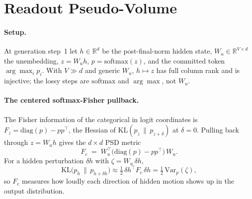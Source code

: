 \documentclass[10pt, letterpaper]{article}
\newcommand{\Fc}{F_{c}}
\newcommand{\Wu}{W_{u}}
\begin{document}
\section{Readout Pseudo-Volume}
\label{sec:method}

\paragraph{Setup.}
At generation step~1 let $h\in\mathbb{R}^d$ be the post-final-norm
hidden state, $\Wu\in\mathbb{R}^{V\times d}$ the unembedding,
$z=\Wu h$, $p=\mathrm{softmax}(z)$, and the committed token
$\arg\max_i p_i$. With $V\gg d$ and generic $\Wu$, $h\mapsto z$ has
full column rank and is injective; the lossy steps are
$\mathrm{softmax}$ and $\arg\max$, not $\Wu$.

\paragraph{The centered softmax-Fisher pullback.}
The Fisher information of the categorical in logit coordinates is
$F_z=\mathrm{diag}(p)-pp^{\top}$, the Hessian of
$\mathrm{KL}(p_z\,\|\,p_{z+\delta})$ at $\delta=0$. Pulling back through
$z=\Wu h$ gives the $d\times d$ PSD metric
\begin{equation}
\Fc \;=\; \Wu^{\top}\!\big(\mathrm{diag}(p)-pp^{\top}\big)\,\Wu .
\end{equation}
For a hidden perturbation $\delta h$ with $\zeta=\Wu\,\delta h$,
\begin{equation}
\mathrm{KL}\big(p_h\,\|\,p_{h+\delta h}\big)\approx
\tfrac12\,\delta h^{\top}\Fc\,\delta h
=\tfrac12\,\mathrm{Var}_p(\zeta),
\end{equation}
so $\Fc$ measures how loudly each direction of hidden motion shows up
in the output distribution.
\end{document}
